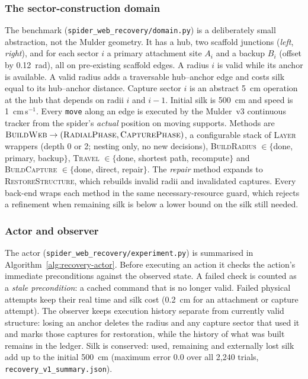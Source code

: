 \subsubsection{The sector-construction domain}
The benchmark (\texttt{spider\_web\_recovery/domain.py}) is a deliberately small abstraction, not the
Mulder geometry. It has a hub, two scaffold junctions (\emph{left}, \emph{right}), and for each sector $i$
a primary attachment site $A_i$ and a backup $B_i$ (offset by 0.12~rad), all on pre-existing scaffold
edges. A radius $i$ is valid while its anchor is available. A valid radius adds a traversable hub--anchor
edge and costs silk equal to its hub--anchor distance. Capture sector $i$ is an abstract 5~cm operation at
the hub that depends on radii $i$ and $i-1$. Initial silk is 500~cm and speed is 1~cm\,s$^{-1}$. Every
\texttt{move} along an edge is executed by the Mulder~v3 continuous tracker from the spider's
\emph{actual} position on moving supports. Methods are
$\textsc{BuildWeb}\to(\textsc{RadialPhase},\textsc{CapturePhase})$, a configurable stack of
\textsc{Layer} wrappers (depth 0 or 2; nesting only, no new decisions), \textsc{BuildRadius}
$\in\{$done, primary, backup$\}$, \textsc{Travel} $\in\{$done, shortest path, recompute$\}$ and
\textsc{BuildCapture} $\in\{$done, direct, repair$\}$. The \emph{repair} method expands to
\textsc{RestoreStructure}, which rebuilds invalid radii and invalidated captures. Every back-end wraps
each method in the same necessary-resource guard, which rejects a refinement when remaining silk is below
a lower bound on the silk still needed.

\subsubsection{Actor and observer}
The actor (\texttt{spider\_web\_recovery/experiment.py}) is summarised in
Algorithm~\ref{alg:recovery-actor}. Before executing an action it checks the action's immediate
preconditions against the observed state. A failed check is counted as a \emph{stale precondition}: a
cached command that is no longer valid. Failed physical attempts keep their real time and silk cost
(0.2~cm for an attachment or capture attempt). The observer keeps execution history separate from
currently valid structure: losing an anchor deletes the radius and any capture sector that used it and
marks those captures for restoration, while the history of what was built remains in the ledger. Silk is
conserved: used, remaining and externally lost silk add up to the initial 500~cm (maximum error 0.0 over
all 2,240 trials, \texttt{recovery\_v1\_summary.json}).

